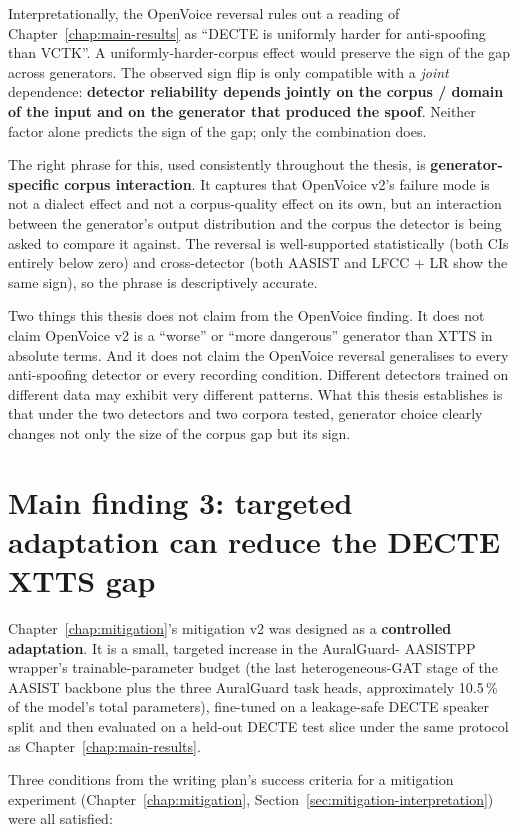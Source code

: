 Interpretationally, the OpenVoice reversal rules out a reading of
Chapter~\ref{chap:main-results} as ``DECTE is uniformly harder for anti-spoofing than
VCTK''. A uniformly-harder-corpus effect would preserve the sign
of the gap across generators. The observed sign flip is only
compatible with a \emph{joint} dependence: \textbf{detector reliability
depends jointly on the corpus / domain of the input and on the
generator that produced the spoof}. Neither factor alone predicts
the sign of the gap; only the combination does.

The right phrase for this, used consistently throughout the
thesis, is \textbf{generator-specific corpus interaction}. It captures
that OpenVoice v2's failure mode is not a dialect effect and not
a corpus-quality effect on its own, but an interaction between the
generator's output distribution and the corpus the detector is
being asked to compare it against. The reversal is well-supported
statistically (both CIs entirely below zero) and cross-detector
(both AASIST and LFCC + LR show the same sign), so the phrase is
descriptively accurate.

Two things this thesis does not claim from the OpenVoice
finding. It does not claim OpenVoice v2 is a ``worse'' or ``more
dangerous'' generator than XTTS in absolute terms. And it does
not claim the OpenVoice reversal generalises to every anti-spoofing
detector or every recording condition. Different detectors trained
on different data may exhibit very different patterns. What this
thesis establishes is that under the two detectors and two corpora
tested, generator choice clearly changes not only the size of
the corpus gap but its sign.


\section{Main finding 3: targeted adaptation can reduce the DECTE XTTS gap}
\label{sec:discussion-rq3}

Chapter~\ref{chap:mitigation}'s mitigation v2 was designed as a \textbf{controlled
adaptation}. It is a small, targeted increase in the AuralGuard-%
AASISTPP wrapper's trainable-parameter budget (the last
heterogeneous-GAT stage of the AASIST backbone plus the three
AuralGuard task heads, approximately 10.5\,\% of the model's total
parameters), fine-tuned on a leakage-safe DECTE speaker split and
then evaluated on a held-out DECTE test slice under the same
protocol as Chapter~\ref{chap:main-results}.

Three conditions from the writing plan's success criteria for a
mitigation experiment (Chapter~\ref{chap:mitigation}, Section~\ref{sec:mitigation-interpretation}) were all
satisfied:

